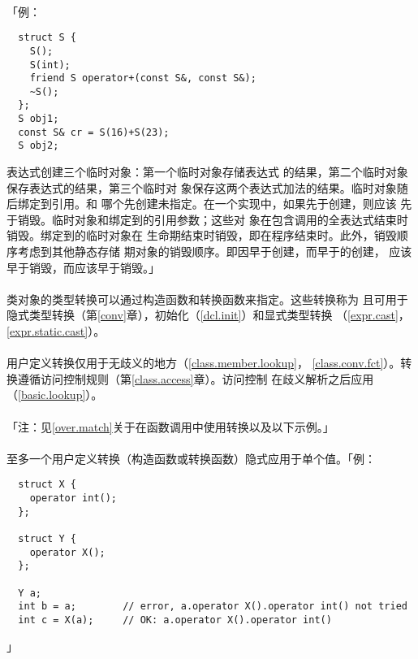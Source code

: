 \paragraph{}
「例：
\begin{lstlisting}
  struct S {
    S();
    S(int);
    friend S operator+(const S&, const S&);
    ~S();
  };
  S obj1;
  const S& cr = S(16)+S(23);
  S obj2;
\end{lstlisting}
表达式创建三个临时对象：第一个临时对象存储表达式
的结果，第二个临时对象保存表达式的结果，第三个临时对
象保存这两个表达式加法的结果。临时对象随后绑定到引用。和
哪个先创建未指定。在一个实现中，如果先于创建，则应该
先于销毁。临时对象和绑定到的引用参数；这些对
象在包含调用的全表达式结束时销毁。绑定到的临时对象在
生命期结束时销毁，即在程序结束时。此外，销毁顺序考虑到其他静态存储
期对象的销毁顺序。即因早于创建，而早于的创建，
应该早于销毁，而应该早于销毁。」

\paragraph{}
类对象的类型转换可以通过构造函数和转换函数来指定。这些转换称为
且可用于隐式类型转换（第\ref{conv}章），初始化（\ref{dcl.init}）和显式类型转换
（\ref{expr.cast}，\ref{expr.static.cast}）。

\paragraph{}
用户定义转换仅用于无歧义的地方（\ref{class.member.lookup}，
\ref{class.conv.fct}）。转换遵循访问控制规则（第\ref{class.access}章）。访问控制
在歧义解析之后应用（\ref{basic.lookup}）。

\paragraph{}
「注：见\ref{over.match}关于在函数调用中使用转换以及以下示例。」

\paragraph{}
至多一个用户定义转换（构造函数或转换函数）隐式应用于单个值。「例：
\begin{lstlisting}
  struct X {
    operator int();
  };

  struct Y {
    operator X();
  };

  Y a;
  int b = a;        // error, a.operator X().operator int() not tried
  int c = X(a);     // OK: a.operator X().operator int()
\end{lstlisting}」

